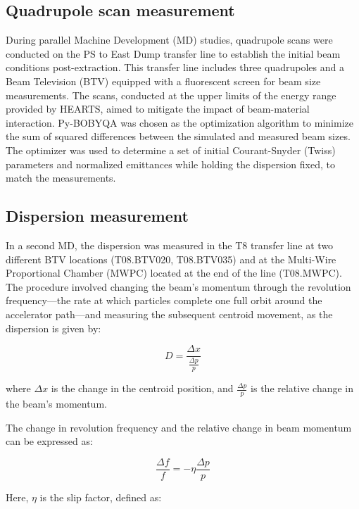 \documentclass[a4paper,
               biblatex,     %
               ]{jacow}
\begin{document}
\subsection{Quadrupole scan measurement}

During parallel Machine Development (MD) studies, quadrupole scans were conducted on the PS to East Dump transfer line to establish the initial beam conditions post-extraction. This transfer line includes three quadrupoles and a Beam Television (BTV) equipped with a fluorescent screen for beam size measurements. The scans, conducted at the upper limits of the energy range provided by HEARTS, aimed to mitigate the impact of beam-material interaction. Py-BOBYQA \cite{cartis_escaping_2022, cartis_improving_2019} was chosen as the optimization algorithm to minimize the sum of squared differences between the simulated and measured beam sizes. The optimizer was used to determine a set of initial Courant-Snyder (Twiss) parameters and normalized emittances while holding the dispersion fixed, to match the measurements.


\subsection{Dispersion measurement}

In a second MD, the dispersion was measured in the T8 transfer line at two different BTV locations (T08.BTV020, T08.BTV035) and at the Multi-Wire Proportional Chamber (MWPC) located at the end of the line (T08.MWPC). The procedure involved changing the beam's momentum through the revolution frequency—the rate at which particles complete one full orbit around the accelerator path—and measuring the subsequent centroid movement, as the dispersion is given by:

\begin{equation}
D = \frac{\Delta x}{\frac{\Delta p}{p}}
\end{equation}

where $\Delta x$ is the change in the centroid position, and $\frac{\Delta p}{p}$ is the relative change in the beam's momentum.

The change in revolution frequency and the relative change in beam momentum can be expressed as:

\begin{equation}
\frac{\Delta f}{f} = -\eta \frac{\Delta p}{p}
\end{equation}

Here, $\eta$ is the slip factor, defined as:
\end{document}
